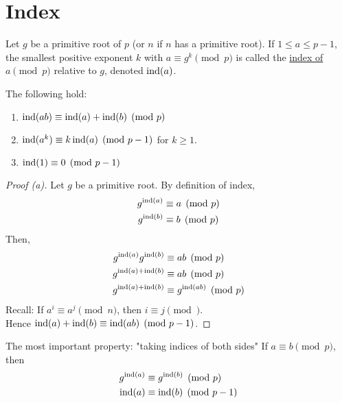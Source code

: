\section{Index}
    \begin{definition}
        Let $g$ be a primitive root of $p$ (or $n$ if $n$ has a primitive root).
        If $1\le a\le p-1$, the smallest positive exponent $k$ with $a\equiv g^k\pmod{p}$
        is called the \underline{index of $a\pmod{p}$} relative to $g$, 
        denoted $\operatorname{ind}(a)$.
    \end{definition}
    \begin{theorem}
        The following hold:
        \begin{enumerate} [label=\alph*)]
            \item $\operatorname{ind}(ab)\equiv \operatorname{ind}(a)+\operatorname{ind}(b)\pmod{p}$
            \item $\operatorname{ind}(a^k)\equiv k\operatorname{ind}(a)\pmod{p-1}$ for $k\ge 1$.
            \item $\operatorname{ind}(1)\equiv 0\pmod{p-1}$
        \end{enumerate}
        \begin{proof} [Proof (a)]
            Let $g$ be a primitive root. By definition of index,
            \begin{align*}
                g^{\operatorname{ind}(a)} &\equiv a\pmod{p} \\
                g^{\operatorname{ind}(b)} &\equiv b\pmod{p}
            \end{align*}
            Then,
            \begin{align*}
                g^{\operatorname{ind}(a)}g^{\operatorname{ind}(b)} &\equiv ab\pmod{p} \\
                g^{\operatorname{ind}(a)+\operatorname{ind}(b)} &\equiv ab\pmod{p} \\
                g^{\operatorname{ind}(a)+\operatorname{ind}(b)} &\equiv g^{\operatorname{ind}(ab)}\pmod{p}
            \end{align*}
            Recall: If $a^i\equiv a^j\pmod{n}$, then $i\equiv j\pmod{}$. \\
            Hence $\operatorname{ind}(a)+\operatorname{ind}(b)\equiv \operatorname{ind}(ab)\pmod{p-1}$.
        \end{proof}
    \end{theorem}
    The most important property: "taking indices of both sides"
    If $a\equiv b\pmod{p}$, then
    \begin{align*} 
        g^{\operatorname{ind}(a)} &\equiv g^{\operatorname{ind}(b)}\pmod{p} \\
        \operatorname{ind}(a) &\equiv \operatorname{ind}(b)\pmod{p-1}
    \end{align*}
